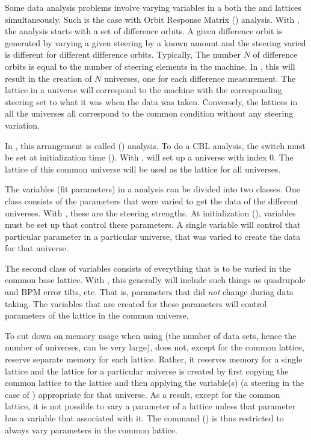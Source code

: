 {{{{Some data analysis problems involve varying variables in a both the
 and  lattices simultaneously. Such is the case
with Orbit Response Matrix () analysis\cite{b:orm}. With
, the analysis starts with a set of difference orbits. A given
difference orbit is generated by varying a given steering by a known
amount and the steering varied is different for different difference
orbits. Typically, The number $N$ of difference orbits is equal to the
number of steering elements in the machine. In \tao, this will result
in the creation of $N$ universes, one for each difference
measurement. The  lattice in a universe will correspond to
the machine with the corresponding steering set to what it was when
the data was taken. Conversely, the  lattices in all the
universes all correspond to the common condition without any steering
variation.

In \tao, this arrangement is called 
() analysis. To do a CBL analysis, the 
switch must be set at initialization time ().  With
, \tao will set up a  universe with index 0.
The  lattice of this common universe will be used as the
 lattice for all universes. 

The variables (fit parameters) in a  analysis can be divided
into two classes. One class consists of the parameters that were
varied to get the data of the different universes. With ,
these are the steering strengths. At initialization
(), variables must be set up that control these
parameters. A single variable will control that particular parameter in
a particular universe, that was varied to create the data for that
universe. 

The second class of variables consists of everything that is
to be varied in the common base lattice. With , this generally
will include such things as quadrupole and BPM error tilts, etc. That
is, parameters that did {\em not} change during data taking. The
\tao variables that are created for these parameters will control
parameters of the  lattice in the common universe.

To cut down on memory usage when using  (the number of data
sets, hence the number of universes, can be very large), \tao does
not, except for the common  lattice, reserve separate memory
for each  lattice. Rather, it reserves memory for a single
 lattice and the  lattice for a particular
universe is created by first copying the common  lattice to
the  lattice and then applying the variable(s) (a steering
in the case of ) appropriate for that universe.  As a result,
except for the common  lattice, it is not possible to vary a
parameter of a  lattice unless that parameter has a \tao
variable that associated with it. The  command
() is thus restricted to always vary parameters in
the common  lattice.

}}}}
